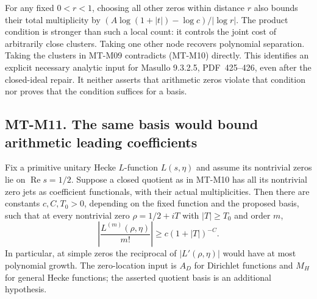 \documentclass[11pt,a4paper]{article}
\begin{document}
For any fixed $0<r<1$, choosing all other zeros within distance
$r$ also bounds their total multiplicity by
$(A\log(1+|t|)-\log c)/|\log r|$.
The product condition is stronger than such a local count:
it controls the joint cost of arbitrarily close clusters.
Taking one other node recovers polynomial separation.
Taking the clusters in MT-M09 contradicts (MT-M10) directly.
This identifies an explicit necessary analytic input for
Masullo 9.3.2.5, PDF~425--426, even after the closed-ideal repair.
It neither asserts that arithmetic zeros violate that condition
nor proves that the condition suffices for a basis.

\subsection*{MT-M11. The same basis would bound arithmetic leading coefficients}
Fix a primitive unitary Hecke $L$-function $L(s,\eta)$ and assume
its nontrivial zeros lie on $\operatorname{Re}s=1/2$.
Suppose a closed quotient as in MT-M10 has all its nontrivial
zero jets as coefficient functionals, with their actual
multiplicities. Then there are constants $c,C,T_0>0$, depending
on the fixed function and the proposed basis, such that at every
nontrivial zero $\rho=1/2+iT$ with $|T|\ge T_0$ and order $m$,
\[
               \left|\frac{L^{(m)}(\rho,\eta)}{m!}\right|
                        \ge c(1+|T|)^{-C}.             \tag{MT-M11}
\]
In particular, at simple zeros the reciprocal of $|L'(\rho,\eta)|$
would have at most polynomial growth. The zero-location input is
$A_D$ for Dirichlet functions and $M_H$ for general Hecke functions;
the asserted quotient basis is an additional hypothesis.
\end{document}

